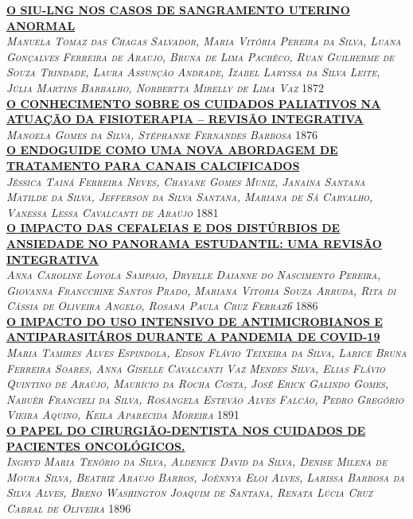 \noindent \textsc{\hyperlink{trabalhos/251620.pdf.1}{\textbf{O  SIU-LNG  NOS CASOS DE SANGRAMENTO UTERINO ANORMAL}}}\\ 
\noindent \textsc{\textit{Manuela Tomaz das Chagas Salvador, Maria Vitória Pereira da Silva, Luana Gonçalves Ferreira de Araujo, Bruna de Lima Pachêco, Ruan Guilherme de Souza Trindade, Laura Assunção Andrade, Izabel Laryssa da Silva Leite, Júlia Martins Barbalho, Norbertta Mirelly de Lima Vaz}} \hfill 1872\\ 

\noindent \textsc{\hyperlink{trabalhos/251510.pdf.1}{\textbf{O CONHECIMENTO SOBRE OS CUIDADOS PALIATIVOS NA ATUAÇÃO DA FISIOTERAPIA – REVISÃO INTEGRATIVA }}}\\ 
\noindent \textsc{\textit{Manoela Gomes da Silva, Stéphanne Fernandes Barbosa}} \hfill 1876\\ 

\noindent \textsc{\hyperlink{trabalhos/250270.pdf.1}{\textbf{O ENDOGUIDE COMO UMA NOVA ABORDAGEM DE TRATAMENTO PARA CANAIS CALCIFICADOS}}}\\ 
\noindent \textsc{\textit{Jéssica Tainá Ferreira Neves, Chayane Gomes Muniz, Janaína Santana Matilde da Silva, Jefferson da Silva Santana, Mariana de Sá Carvalho, Vanessa Lessa Cavalcanti de Araújo}} \hfill 1881\\ 

\noindent \textsc{\hyperlink{trabalhos/251595.pdf.1}{\textbf{O IMPACTO DAS CEFALEIAS E DOS DISTÚRBIOS DE ANSIEDADE NO PANORAMA ESTUDANTIL: UMA REVISÃO INTEGRATIVA}}}\\ 
\noindent \textsc{\textit{Anna Caroline Loyola Sampaio, Dryelle Daianne do Nascimento Pereira, Giovanna Francchine Santos Prado, Mariana Vitoria Souza Arruda, Rita di Cássia de Oliveira Angelo, Rosana Paula Cruz Ferraz6}} \hfill 1886\\ 

\noindent \textsc{\hyperlink{trabalhos/251580.pdf.1}{\textbf{O IMPACTO DO USO INTENSIVO DE ANTIMICROBIANOS E ANTIPARASITÁROS DURANTE A PANDEMIA DE COVID-19 }}}\\ 
\noindent \textsc{\textit{Maria Tamires Alves Espindola, Edson Flávio Teixeira da Silva, Larice Bruna Ferreira Soares, Anna Giselle Cavalcanti Vaz Mendes Silva, Elias Flávio Quintino de Araújo, Maurício da Rocha Costa, José Erick Galindo Gomes, Nabuêr Francieli da Silva, Rosângela Estevão Alves Falcão, Pedro Gregório Vieira Aquino, Keila Aparecida Moreira}} \hfill 1891\\ 

\noindent \textsc{\hyperlink{trabalhos/251523.pdf.1}{\textbf{O PAPEL DO CIRURGIÃO-DENTISTA NOS CUIDADOS DE PACIENTES ONCOLÓGICOS.}}}\\ 
\noindent \textsc{\textit{Ingryd Maria Tenório da Silva, Aldenice David da Silva, Denise Milena de Moura Silva, Beatriz Araújo Barros, Joênnya Eloi Alves, Larissa Barbosa da Silva Alves, Breno Washington Joaquim de Santana, Renata Lúcia Cruz Cabral de Oliveira}} \hfill 1896\\ 

